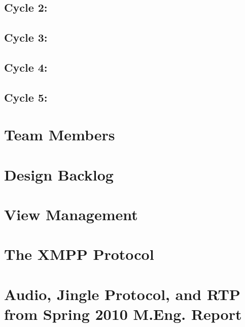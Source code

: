 \documentclass[12pt, letterpaper]{article}
\begin{document}
\subsection{Cycle 2: }

\subsection{Cycle 3: }

\subsection{Cycle 4: }

\subsection{Cycle 5: }

{\footnotesize 
}

\clearpage
\onecolumn
\begin{center}
\appendix
\section{Team Members}

\clearpage
\section{Design Backlog}

\clearpage
\section{View Management}

\clearpage
\section{The XMPP Protocol}

\clearpage
\section{Audio, Jingle Protocol, and RTP from Spring 2010 M.Eng. Report}
\end{center}
\end{document}
